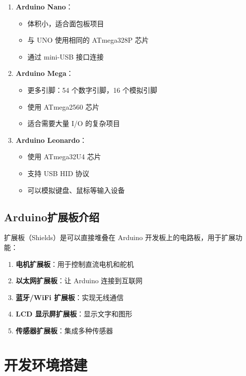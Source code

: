 \documentclass[12pt,UTF8]{ctexbook}
\begin{document}
\begin{enumerate}
    \item \textbf{Arduino Nano}：
    \begin{itemize}
        \item 体积小，适合面包板项目
        \item 与 UNO 使用相同的 ATmega328P 芯片
        \item 通过 mini-USB 接口连接
    \end{itemize}
    
    \item \textbf{Arduino Mega}：
    \begin{itemize}
        \item 更多引脚：54 个数字引脚，16 个模拟引脚
        \item 使用 ATmega2560 芯片
        \item 适合需要大量 I/O 的复杂项目
    \end{itemize}
    
    \item \textbf{Arduino Leonardo}：
    \begin{itemize}
        \item 使用 ATmega32U4 芯片
        \item 支持 USB HID 协议
        \item 可以模拟键盘、鼠标等输入设备
    \end{itemize}
\end{enumerate}

\section{Arduino扩展板介绍}

扩展板（Shields）是可以直接堆叠在 Arduino 开发板上的电路板，用于扩展功能：

\begin{enumerate}
    \item \textbf{电机扩展板}：用于控制直流电机和舵机
    \item \textbf{以太网扩展板}：让 Arduino 连接到互联网
    \item \textbf{蓝牙/WiFi 扩展板}：实现无线通信
    \item \textbf{LCD 显示屏扩展板}：显示文字和图形
    \item \textbf{传感器扩展板}：集成多种传感器
\end{enumerate}

\chapter{开发环境搭建}
\end{document}
